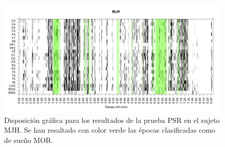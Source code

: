 \documentclass[12pt,a4paper]{mitthesis}
\begin{document}

\begin{figure}
\includegraphics[width=\textwidth]
{./g170413/MJNNVIGILOS_est.png}
\caption{Disposici\'on gr\'afica para los resultados de la prueba PSR en el sujeto MJH. Se han 
resaltado con color verde las \'epocas clasificadas como de sue\~no MOR.
}
\label{ejemplo_graf}
\end{figure}

\end{document}
